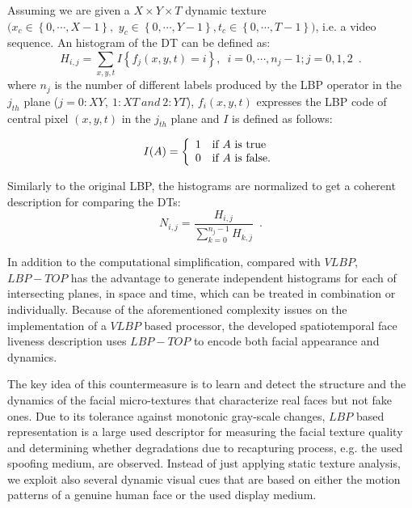Assuming we are given a $X\times Y \times T$ dynamic texture \\ $(x_c \in \left\{0,\cdots,X-1\right\},$ $y_c \in\left\{0,\cdots,Y-1\right\}, t_c\in\left\{0,\cdots,T-1\right\})$, i.e. a video sequence. An histogram of the DT can be defined as: 
\begin{equation}
H_{i,j}=\sum_{x,y,t}I\left\{f_{j}(x,y,t)=i\right\},\enspace i=0,\cdots,n_j-1;j=0,1,2 \enspace.
\end{equation}
where $n_j$ is the number of different labels produced by the LBP operator in the $j_{th}$ plane ($j=0: XY,~1: XT~and~2: YT$), $f_i(x,y,t)$ expresses the LBP code of central pixel $(x,y,t)$ in the $j_{th}$ plane and $I$ is defined as follows:

\begin{equation}
I(A) = \left\{ 
  \begin{array}{l l}
    1 &  \textrm{if $A$ is true}\\
    0 &  \textrm{if $A$ is false.}\\
  \end{array} \right.
\end{equation}


Similarly to the original LBP, the histograms are normalized to get a coherent description for comparing the DTs:
\begin{equation}
N_{i,j}=\frac{H_{i,j}}{\sum_{k=0}^{n_j-1}H_{k,j}} \enspace .
\end{equation}

In addition to the computational simplification, compared with $VLBP$, $LBP-TOP$ has the advantage to generate independent histograms for each of intersecting planes, in space and time, which can be treated in combination or individually. Because of the aforementioned complexity issues on the implementation of a $VLBP$ based processor, the developed spatiotemporal face liveness description uses $LBP-TOP$ to encode both facial appearance and dynamics. 

The key idea of this countermeasure is to learn and detect the structure and the dynamics of the facial micro-textures that characterize real faces but not fake ones. Due to its tolerance against monotonic gray-scale changes, $LBP$ based representation is a large used descriptor for measuring the facial texture quality and determining whether degradations due to recapturing process, e.g. the used spoofing medium, are observed. Instead of just applying static texture analysis, we exploit also several dynamic visual cues that are based on either the motion patterns of a genuine human face or the used display medium.


